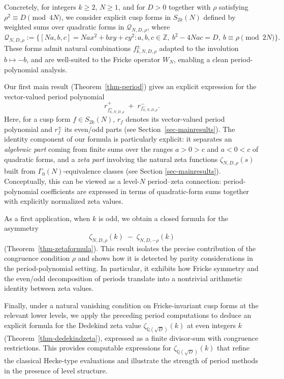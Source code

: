 \documentclass[12pt]{amsart}
\numberwithin{equation}{section}
\theoremstyle{definition}
\begin{document}
Concretely, for integers $k\ge 2$, $N\ge 1$, and for $D>0$ together with $\rho$ satisfying $\rho^2\equiv D\pmod{4N}$, we consider explicit cusp forms in $S_{2k}(N)$ defined by weighted sums over quadratic forms in $\mathcal{Q}_{N,D,\rho}$, where
\[
\mathcal{Q}_{N,D,\rho}:=\{[Na,b,c]=Nax^{2}+bxy+cy^{2}:a,b,c\in\mathbb{Z},\ b^{2}-4Nac=D,\ b\equiv\rho\pmod{2N}\}.
\]
These forms admit natural combinations $f_{k,N,D,\rho}^{\pm}$ adapted to the involution $b\mapsto -b$, and are well-suited to the Fricke operator $W_N$, enabling a clean period-polynomial analysis.

Our first main result (Theorem~\ref{thm-period}) gives an explicit expression for the vector-valued period polynomial
\[
r^+_{f^+_{k,N,D,\rho}} \;+\; r^-_{f^-_{k,N,D,\rho}}.
\]
Here, for a cusp form $f\in S_{2k}(N)$, $r_f$ denotes its vector-valued period polynomial and $r_f^{\pm}$ its even/odd parts (see Section~\ref{sec-mainresults}).
The identity component of our formula is particularly explicit: it separates an \emph{algebraic part} coming from finite sums over the ranges $a>0>c$ and $a<0<c$ of quadratic forms, and a \emph{zeta part} involving the natural zeta functions $\zeta_{N,D,\rho}(s)$ built from $\Gamma_0(N)$-equivalence classes (see Section \ref{sec-mainresults}).
Conceptually, this can be viewed as a level-$N$ period--zeta connection: period-polynomial coefficients are expressed in terms of quadratic-form sums together with explicitly normalized zeta values.

As a first application, when $k$ is odd, we obtain a closed formula for the asymmetry
\[
\zeta_{N,D,\rho}(k)\;-\;\zeta_{N,D,-\rho}(k)
\]
(Theorem~\ref{thm-zetaformula}). This result isolates the precise contribution of the congruence condition $\rho$ and shows how it is detected by parity considerations in the period-polynomial setting. In particular, it exhibits how Fricke symmetry and the even/odd decomposition of periods translate into a nontrivial arithmetic identity between zeta values.

Finally, under a natural vanishing condition on Fricke-invariant cusp forms at the relevant lower levels, we apply the preceding period computations to deduce an explicit formula for the Dedekind zeta value $\zeta_{\mathbb{Q}(\sqrt{D})}(k)$ at even integers $k$ (Theorem~\ref{thm-dedekindzeta}), expressed as a finite divisor-sum with congruence restrictions. This provides computable expressions for $\zeta_{\mathbb{Q}(\sqrt{D})}(k)$ that refine the classical Hecke-type evaluations and illustrate the strength of period methods in the presence of level structure.
\end{document}
